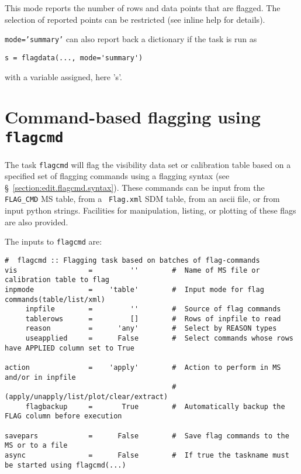 This mode reports the number of rows and data points that are
flagged. The selection of reported points can be restricted (see
inline help for details).

{\tt mode='summary'} can also report back a dictionary if the task is run as 

\small
\begin{verbatim}
s = flagdata(..., mode='summary')
\end{verbatim}
\normalsize

with a variable assigned, here 's'.



\section{Command-based flagging using {\tt flagcmd}}
\label{section:edit.flagcmd}

The task {\tt flagcmd} will flag the visibility data set or
calibration table based on a specified set of flagging commands using
a flagging syntax (see \S~\ref{section:edit.flagcmd.syntax}).  These
commands can be input from the {\tt FLAG\_CMD} MS table, from a {\tt
  Flag.xml} SDM table, from an ascii file, or from input python
strings.  Facilities for manipulation, listing, or plotting of these
flags are also provided.

The inputs to {\tt flagcmd} are:
\small
\begin{verbatim}
#  flagcmd :: Flagging task based on batches of flag-commands
vis                 =         ''        #  Name of MS file or calibration table to flag
inpmode             =    'table'        #  Input mode for flag commands(table/list/xml)
     inpfile        =         ''        #  Source of flag commands
     tablerows      =         []        #  Rows of inpfile to read
     reason         =      'any'        #  Select by REASON types
     useapplied     =      False        #  Select commands whose rows have APPLIED column set to True

action              =    'apply'        #  Action to perform in MS and/or in inpfile
                                        #   (apply/unapply/list/plot/clear/extract)
     flagbackup     =       True        #  Automatically backup the FLAG column before execution

savepars            =      False        #  Save flag commands to the MS or to a file
async               =      False        #  If true the taskname must be started using flagcmd(...)

\end{verbatim}
\normalsize

